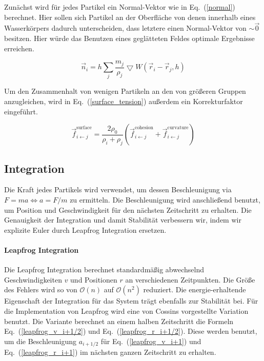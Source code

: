 \documentclass[a4paper]{paper}
\renewcommand{\eqref}[1]{Eq.~(\ref{#1})}
\begin{document}
Zunächst wird für jedes Partikel ein Normal-Vektor wie in \eqref{normal} berechnet. Hier sollen sich Partikel an der Oberfläche von denen innerhalb eines Wasserkörpers dadurch unterscheiden, dass letztere einen Normal-Vektor von $\sim \vec{0}$ besitzen. Hier würde das Benutzen eines geglätteten Feldes optimale Ergebnisse erreichen.

\begin{equation}
\label{normal}
\vec{n}_{i} = h\sum_{j}\frac{m_{j}}{\rho_{j}}\bigtriangledown W (\vec{r}_{i}-\vec{r}_{j},h)
\end{equation}


Um den Zusammenhalt von wenigen Partikeln an den von größeren Gruppen anzugleichen, wird in \eqref{surface_tension} außerdem ein Korrekturfaktor eingeführt.

\begin{equation}
	\label{surface_tension}
	\vec{f}_{i\leftarrow j}^{\text{surface}} = \frac{2\rho_{0}}{\rho_{i}+\rho_{j}} (\vec{f}_{i\leftarrow j}^{\text{cohesion}} + \vec{f}_{i\leftarrow j}^{\text{curvature}})
\end{equation}



\subsection{Integration}

Die Kraft jedes Partikels wird verwendet, um dessen Beschleunigung via $F=ma \Leftrightarrow  a = F/m$ zu ermitteln. Die Beschleunigung wird anschließend benutzt, um Position und Geschwindigkeit für den nächsten Zeitschritt zu erhalten.
Die Genauigkeit der Integration und damit Stabilität verbessern wir, indem wir explizite Euler durch Leapfrog Integration ersetzen. 
\paragraph{Leapfrog Integration}
Die Leapfrog Integration berechnet standardmäßig abwechselnd Geschwindigkeiten $v$ und Positionen $r$ an verschiedenen Zeitpunkten. Die Größe des Fehlers wird so von $\mathcal{O}(n)$ auf $\mathcal{O}(n^2)$ reduziert. Die energie-erhaltende Eigenschaft der Integration für das System trägt ebenfalls zur Stabilität bei.  
Für die Implementation von Leapfrog wird eine von Cossins \citep{Leapfrog} vorgestellte Variation benutzt. Die Variante berechnet an einem halben Zeitschritt die Formeln \eqref{leapfrog_v_i+1/2} und \eqref{leapfrog_r_i+1/2}. Diese werden benutzt, um die Beschleunigung $a_{i+1/2}$ für \eqref{leapfrog_v_i+1} und \eqref{leapfrog_r_i+1} im nächsten ganzen Zeitschritt zu erhalten.
\end{document}
